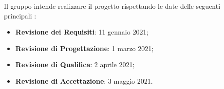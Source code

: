 Il gruppo \Gruppo{} intende realizzare il progetto \NomeProgetto{} rispettando le date delle seguenti principali :
\begin{itemize}
    \item \textbf{Revisione dei Requisiti}: 11 gennaio 2021;
    \item \textbf{Revisione di Progettazione}: 1 marzo 2021;
    \item \textbf{Revisione di Qualifica}: 2 aprile 2021;
    \item \textbf{Revisione di Accettazione}: 3 maggio 2021.
\end{itemize}